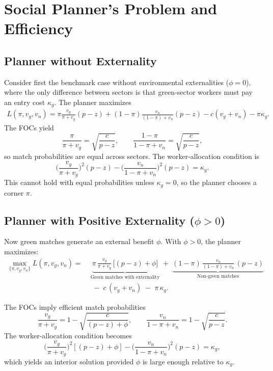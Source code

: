 \documentclass[preprint,12pt]{elsarticle}
\begin{document}
\section{Social Planner’s Problem and Efficiency} \label{app:planner}

\subsection{Planner without Externality} \label{app:planner-A}

Consider first the benchmark case without environmental externalities (\(\phi = 0\)), where the only difference between sectors is that green-sector workers must pay an entry cost \(\kappa_g\). The planner maximizes
\begin{align}
L(\pi,v_g,v_n) = 
\pi \frac{v_g}{\pi+v_g}(p-z)
+ (1-\pi)\frac{v_n}{(1-\pi)+v_n}(p-z)
- c(v_g+v_n)-\pi\kappa_g.
\label{A.1}
\end{align}
The FOCs yield
\[
\frac{\pi}{\pi+v_g}=\sqrt{\frac{c}{p-z}}, \qquad
\frac{1-\pi}{1-\pi+v_n}=\sqrt{\frac{c}{p-z}},
\]
so match probabilities are equal across sectors. The worker-allocation condition is
\[
\Big(\frac{v_g}{\pi+v_g}\Big)^2(p-z) - \Big(\frac{v_n}{1-\pi+v_n}\Big)^2(p-z)=\kappa_g.
\]
This cannot hold with equal probabilities unless \(\kappa_g=0\), so the planner chooses a corner \(\pi\).

\subsection{Planner with Positive Externality (\(\phi>0\))} \label{app:planner-B}

Now green matches generate an external benefit \(\phi\). With \(\phi > 0\), the planner maximizes:
\[
\begin{aligned}
\max_{\{\pi,v_g,v_n\}} L(\pi,v_g,v_n)
=\; &\underbrace{\pi\,\frac{v_g}{\pi+v_g}\,\bigl[(p-z)+\phi\bigr]}_{\text{Green matches with externality}}
\;+\;\underbrace{(1-\pi)\,\frac{v_n}{(1-\pi)+v_n}\,(p-z)}_{\text{Non-green matches}} \\
&\;-\; c\,(v_g + v_n)
\;-\;\pi\,\kappa_g.
\end{aligned}
\]

The FOCs imply efficient match probabilities
\[
\frac{v_g}{\pi+v_g}=1-\sqrt{\frac{c}{(p-z)+\phi}}, \qquad
\frac{v_n}{1-\pi+v_n}=1-\sqrt{\frac{c}{p-z}}.
\]
The worker-allocation condition becomes
\[
\Big(\frac{v_g}{\pi+v_g}\Big)^2[(p-z)+\phi] - \Big(\frac{v_n}{1-\pi+v_n}\Big)^2(p-z)=\kappa_g,
\]
which yields an interior solution provided \(\phi\) is large enough relative to \(\kappa_g\).
\end{document}
